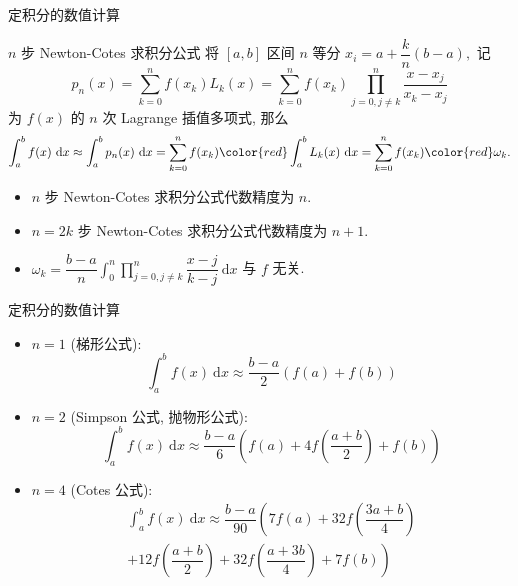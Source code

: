 
\begin{frame}{定积分的数值计算}

\begin{block}{$n$ 步 Newton-Cotes 求积分公式}
将 $[a, b]$ 区间 $n$ 等分 $x_i = a + \dfrac{k}{n}(b-a),$ 记
\[p_n(x) = \sum\limits_{k=0}^n f(x_k) L_k(x) = \sum\limits_{k=0}^n f(x_k) \prod\limits_{j=0, j\neq k}^n \dfrac{x-x_j}{x_k-x_j}\]
为 $f(x)$ 的 $n$ 次 Lagrange 插值多项式, 那么
\[\int_a^b f(x) ~ \mathrm{d} x \approx \int_a^b p_n(x) ~ \mathrm{d} x = \sum\limits_{k=0}^n f(x_k) {\color{red}\int_a^b L_k(x) ~ \mathrm{d} x} = \sum\limits_{k=0}^n f(x_k) {\color{red}\omega_k}.\]
\end{block}

\pause

\begin{itemize}
\item $n$ 步 Newton-Cotes 求积分公式代数精度为 $n.$
\item $n=2k$ 步 Newton-Cotes 求积分公式代数精度为 $n+1.$
\item $\omega_k = \dfrac{b-a}{n} \int_0^n \prod\limits_{j=0, j\neq k}^n \dfrac{x-j}{k-j} ~ \mathrm{d} x$ 与 $f$ 无关.
\end{itemize}

\end{frame}


\begin{frame}{定积分的数值计算}

\begin{itemize}[<+->]
\item $n = 1$ (梯形公式):
\[\int_a^b f(x) ~ \mathrm{d} x \approx \dfrac{b-a}{2} \left( f(a) + f(b) \right)\]
\item $n = 2$ (Simpson 公式, 抛物形公式):
\[\int_a^b f(x) ~ \mathrm{d} x \approx \dfrac{b-a}{6} \left( f(a) + 4f\left( \dfrac{a+b}{2} \right) + f(b) \right)\]
\item $n = 4$ (Cotes 公式):
\begin{multline*}
\int_a^b f(x) ~ \mathrm{d} x \approx \dfrac{b-a}{90} \left( 7f(a) + 32f\left( \dfrac{3a+b}{4} \right) \right. \\
+ \left. 12f\left( \dfrac{a+b}{2} \right) + 32f\left( \dfrac{a+3b}{4} \right) + 7f(b) \right)
\end{multline*}
\end{itemize}

\end{frame}

